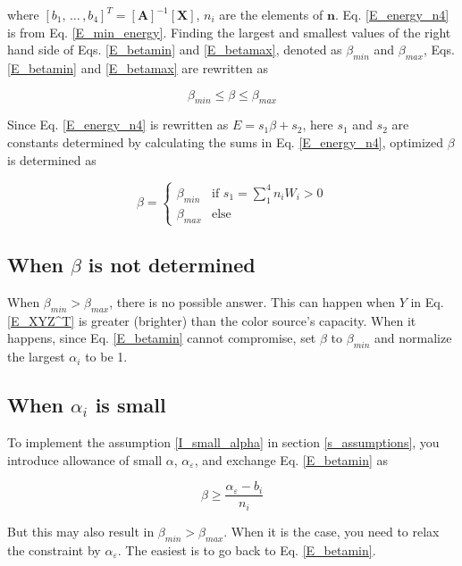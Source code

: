 \documentclass[dvipdfmx,uplatex]{article}
\begin{document}
\noindent
where $ [b_1,\, \ldots\, , b_4]^T = [ \boldsymbol{A} ]^{-1} [\boldsymbol{X}] $, $n_i$ are the elements of $\boldsymbol{n}$. Eq. \ref{E_energy_n4} is from Eq. \ref{E_min_energy}. Finding the largest and smallest values of the right hand side of Eqs. \ref{E_betamin} and \ref{E_betamax}, denoted as $\beta_{min}$ and $\beta_{max}$, Eqs. \ref{E_betamin} and \ref{E_betamax} are rewritten as

\begin{equation}
  \beta_{min} \leq \beta \leq \beta_{max}
\end{equation}

Since Eq. \ref{E_energy_n4} is rewritten as $E = s_1\beta + s_2$, here $s_1$ and $s_2$ are constants determined by calculating the sums in Eq. \ref{E_energy_n4}, optimized $\beta$ is determined as

\begin{equation}
    \beta = \begin{cases}
      \beta_{min}  & \text{if \(s_1 = \sum_1^4 n_i W_i > 0\)} \\
      \beta_{max}  & \text{else}
  \end{cases}
\end{equation}

\subsection{When $\beta$ is not determined}

When $\beta_{min} > \beta_{max}$, there is no possible answer. This can happen when $Y$ in Eq. \ref{E_XYZ^T} is greater (brighter) than the color source's capacity. When it happens, since Eq. \ref{E_betamin} cannot compromise, set $\beta$ to $\beta_{min}$ and normalize the largest $\alpha_i$ to be 1.

\subsection{When $\alpha_i$ is small}

To implement the assumption \ref{I_small_alpha} in section \ref{s_assumptions}, you introduce allowance of small $\alpha$, $\alpha_\varepsilon$, and exchange Eq. \ref{E_betamin} as

\begin{equation}
  \beta \geq \frac{\alpha_\varepsilon - b_i}{n_i}
\end{equation}

But this may also result in $\beta_{min} > \beta_{max}$. When it is the case, you need to relax the constraint by $\alpha_\varepsilon$. The easiest is to go back to Eq. \ref{E_betamin}.
\end{document}

